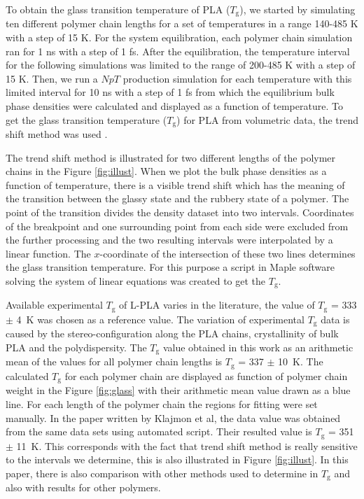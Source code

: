 To obtain the glass transition temperature of PLA ($T_\mathrm{g}$), we started by simulating ten different polymer chain lengths for a set of temperatures in a range 140-485 K with a step of 15 K. For the system equilibration, each polymer chain simulation ran for 1 ns with a step of 1 fs. After the equilibration, the temperature interval for the following simulations was limited to the range of 200-485 K with a step of 15 K. Then, we run a $NpT$ production simulation for each temperature with this limited interval for 10 ns with a step of 1 fs from which the equilibrium bulk phase densities were calculated and displayed as a function of temperature. To get the glass transition temperature ($T_\mathrm{g}$) for PLA from volumetric data, the trend shift method was used \cite{klajmon_does_2022}. 

The trend shift method is illustrated for two different lengths of the polymer chains in the Figure \ref{fig:illust}. When we plot the bulk phase densities as a function of temperature, there is a visible trend shift which has the meaning of the transition between the glassy state and the rubbery state of a polymer. The point of the transition divides the density dataset into two intervals. Coordinates of the breakpoint and one surrounding point from each side were excluded from the further processing and the two resulting intervals were interpolated by a linear function. The $x$-coordinate of the intersection of these two lines determines the glass transition temperature. For this purpose a script in Maple software solving the system of linear equations was created to get the $T_\mathrm{g}$.

Available experimental $T_\mathrm{g}$ of L-PLA varies in the literature, the value  of $T_\mathrm{g}$ = 333 $\pm$ 4~K \cite{pyda_reversing_2005} was chosen as a reference value. The variation of experimental $T_\mathrm{g}$ data is caused by the stereo-configuration along the PLA chains, crystallinity of bulk PLA and the polydispersity. \cite{klajmon_glass_2023} The $T_\mathrm{g}$ value obtained in this work as an arithmetic mean of the values for all polymer chain lengths  is $T_\mathrm{g}$ = 337 $\pm$ 10~K. The calculated $T_\mathrm{g}$ for each polymer chain are displayed as function of polymer chain weight in the Figure \ref{fig:glass} with their arithmetic mean value drawn as a blue line. For each length of the polymer chain the regions for fitting were set manually. In the paper written by Klajmon et al\cite{klajmon_glass_2023}, the data value was obtained from the same data sets using automated script. Their resulted value is $T_\mathrm{g}$ = 351 $\pm$ 11~K. This corresponds with the fact that trend shift method is really sensitive to the intervals we determine, this is also illustrated in Figure \ref{fig:illust}. In this paper, there is also comparison with other methods used to determine in $T_\mathrm{g}$ and also with results for other polymers. 

